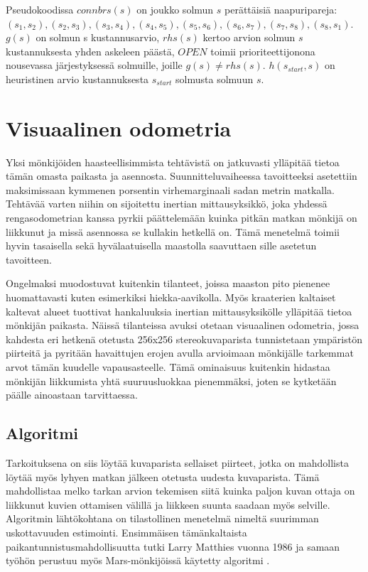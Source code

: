\documentclass[finnish]{tktltiki2}
\theoremstyle{definition}
\theoremstyle{remark}
\begin{document}
Pseudokoodissa $connbrs(s)$ on joukko solmun $s$ perättäisiä naapuripareja: ${(s_1,s_2), (s_2,s_3), (s_3,s_4),(s_4,s_5),(s_5,s_6),(s_6,s_7),(s_7,s_8),(s_8,s_1)}$. $g(s)$ on solmun s kustannusarvio, $rhs(s)$ kertoo arvion solmun $s$ kustannuksesta yhden askeleen päästä, $OPEN$ toimii prioriteettijonona nousevassa järjestyksessä solmuille, joille $g(s) \neq rhs(s)$. $h(s_{start}, s)$ on heuristinen arvio kustannuksesta $s_{start}$ solmusta solmuun $s$.

\section{Visuaalinen odometria}
Yksi mönkijöiden haasteellisimmista tehtävistä on jatkuvasti ylläpitää tietoa tämän omasta paikasta ja asennosta. Suunnitteluvaiheessa tavoitteeksi asetettiin maksimissaan kymmenen porsentin virhemarginaali sadan metrin matkalla. Tehtävää varten niihin on sijoitettu inertian mittausyksikkö, joka yhdessä rengasodometrian kanssa pyrkii päättelemään kuinka pitkän matkan mönkijä on liikkunut ja missä asennossa se kullakin hetkellä on. Tämä menetelmä toimii hyvin tasaisella sekä hyvälaatuisella maastolla saavuttaen sille asetetun tavoitteen.

Ongelmaksi muodostuvat kuitenkin tilanteet, joissa maaston pito pienenee huomattavasti kuten esimerkiksi hiekka-aavikolla. Myös kraaterien kaltaiset kaltevat alueet tuottivat hankaluuksia inertian mittausyksikölle ylläpitää tietoa mönkijän paikasta. Näissä tilanteissa avuksi otetaan visuaalinen odometria, jossa kahdesta eri hetkenä otetusta 256x256 stereokuvaparista tunnistetaan ympäristön piirteitä ja pyritään havaittujen erojen avulla arvioimaan mönkijälle tarkemmat arvot tämän kuudelle vapausasteelle. Tämä ominaisuus kuitenkin hidastaa mönkijän liikkumista yhtä suuruusluokkaa pienemmäksi, joten se kytketään päälle ainoastaan tarvittaessa. \cite{cheng2005visual}

\subsection{Algoritmi}
Tarkoituksena on siis löytää kuvaparista sellaiset piirteet, jotka on mahdollista löytää myös lyhyen matkan jälkeen otetusta uudesta kuvaparista. Tämä mahdollistaa melko tarkan arvion tekemisen siitä kuinka paljon kuvan ottaja on liikkunut kuvien ottamisen välillä ja liikkeen suunta saadaan myös selville. Algoritmin lähtökohtana on tilastollinen menetelmä nimeltä suurimman uskottavuuden estimointi. Ensimmäisen tämänkaltaista paikantunnistusmahdollisuutta tutki Larry Matthies vuonna 1986 ja samaan työhön perustuu myös Mars-mönkijöissä käytetty algoritmi \cite{matthies}.
\end{document}
